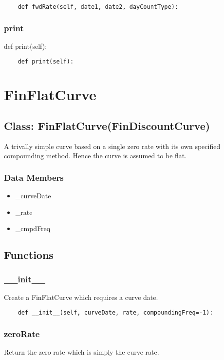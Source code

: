 \documentclass[twoside,11pt]{book}
\begin{document}
\begin{lstlisting}
    def fwdRate(self, date1, date2, dayCountType):
\end{lstlisting}

\subsubsection*{{\bf print}}
def print(self): 

\begin{lstlisting}
    def print(self):
\end{lstlisting}

\newpage
\section{FinFlatCurve}

\subsection*{Class: FinFlatCurve(FinDiscountCurve)}
A trivally simple curve based on a single zero rate with its own specified compounding method. Hence the curve is assumed to be flat.  

\subsubsection*{Data Members}
\begin{itemize}
\item{\_curveDate}
\item{\_rate}
\item{\_cmpdFreq}
\end{itemize}

\subsection*{Functions}

\subsubsection*{{\bf \_\_init\_\_}}
Create a FinFlatCurve which requires a curve date.  

\begin{lstlisting}
    def __init__(self, curveDate, rate, compoundingFreq=-1):
\end{lstlisting}

\subsubsection*{{\bf zeroRate}}
Return the zero rate which is simply the curve rate.  
\end{document}
